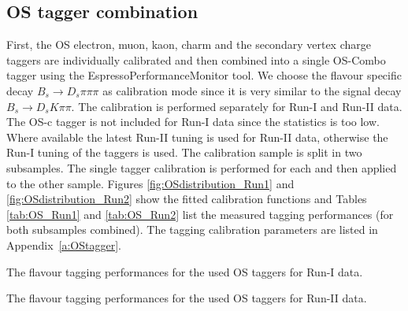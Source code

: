 \clearpage
\subsection{OS tagger combination}
\label{subsec: OScalibration}

First, the OS electron, muon, kaon, charm and the secondary vertex charge taggers are individually calibrated and then combined into a single 
OS-Combo tagger using the \textsf{EspressoPerformanceMonitor} tool.
We choose the flavour specific decay  $B_s \to D_s \pi\pi\pi$ as calibration mode since it is very similar to the signal decay $B_s \to D_s K\pi\pi$.
The calibration is performed separately for Run-I and Run-II data.
The OS-c tagger is not included for Run-I data since the statistics is too low.
Where available the latest Run-II tuning is used for Run-II data, otherwise the Run-I tuning of the taggers is used.
The calibration sample is split in two subsamples. The single tagger calibration is performed for each and then applied to the other sample.
Figures \ref{fig:OSdistribution_Run1} and \ref{fig:OSdistribution_Run2} show the fitted calibration functions
and Tables \ref{tab:OS_Run1} and \ref{tab:OS_Run2} list the measured tagging performances (for both subsamples combined).
The tagging calibration parameters are listed in Appendix~\ref{a:OStagger}.

\begin{table}[h]
\centering
\caption{The flavour tagging performances for the used OS taggers for Run-I data.}
\resizebox{\linewidth}{!}{
	
}
\label{tab:OS_Run1}
%
\caption{The flavour tagging performances for the used OS taggers for Run-II data.}
\resizebox{\linewidth}{!}{
	
}
\label{tab:OS_Run2}
\end{table}

